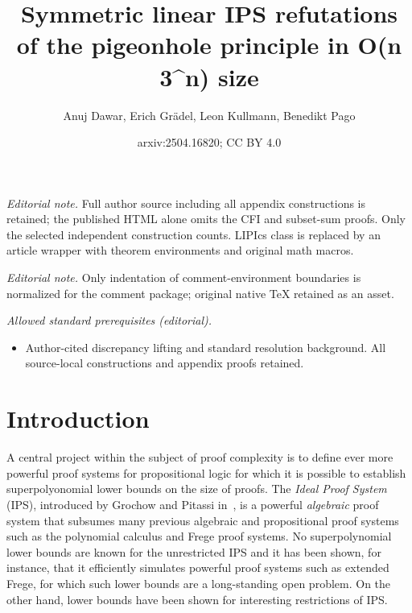 \documentclass[10pt,a4paper]{article}
\title{Symmetric linear IPS refutations of the pigeonhole principle in O(n 3\textasciicircum{}n) size}
\author{Anuj Dawar, Erich Grädel, Leon Kullmann, Benedikt Pago}
\date{arxiv:2504.16820; CC BY 4.0}
\begin{document}
\maketitle
\noindent\textit{Editorial note.} Full author source including all appendix constructions is retained; the published HTML alone omits the CFI and subset-sum proofs. Only the selected independent construction counts. LIPIcs class is replaced by an article wrapper with theorem environments and original math macros.\par\medskip
\noindent\textit{Editorial note.} Only indentation of comment-environment boundaries is normalized for the comment package; original native TeX retained as an asset.\par\medskip
\noindent\textit{Allowed standard prerequisites (editorial).}\begin{itemize}
\item Author-cited discrepancy lifting and standard resolution background. All source-local constructions and appendix proofs retained.
\end{itemize}\medskip
	\section{Introduction}
	A central project within the subject of proof complexity \cite{pitassi, segerlind, krajicekBook} is to define ever more powerful proof systems for propositional logic for which it is possible to establish superpolyonomial lower bounds on the size of proofs. The \emph{Ideal Proof System} (IPS), introduced by Grochow and Pitassi in~\cite{IPS}, is a powerful \emph{algebraic} proof system that subsumes many previous algebraic and propositional proof systems such as the polynomial calculus and Frege proof systems. No superpolynomial lower bounds are known for the unrestricted IPS and it has been shown, for instance, that it efficiently simulates powerful proof systems such as extended Frege, for which such lower bounds are a long-standing open problem.  On the other hand, lower bounds have been shown for interesting restrictions of IPS.
	
\end{document}
